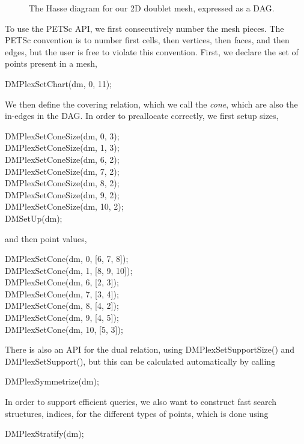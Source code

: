 {{\begin{figure}
\caption{The Hasse diagram for our 2D doublet mesh, expressed as a DAG.}
\label{fig:doubletSieve}
\end{figure}
To use the PETSc API, we first consecutively number the mesh pieces. The PETSc convention is to number first cells,
then vertices, then faces, and then edges, but the user is free to violate this convention. First, we declare the set of
points present in a mesh,
\begin{tabbing}
  DMPlexSetChart(dm, 0, 11);
\end{tabbing}
We then define the covering relation, which we call the \textit{cone}, which are also the in-edges in the DAG. In order
to preallocate correctly, we first setup sizes,
\begin{tabbing}
  DMPlexSetConeSize(dm, 0, 3);\\
  DMPlexSetConeSize(dm, 1, 3);\\
  DMPlexSetConeSize(dm, 6, 2);\\
  DMPlexSetConeSize(dm, 7, 2);\\
  DMPlexSetConeSize(dm, 8, 2);\\
  DMPlexSetConeSize(dm, 9, 2);\\
  DMPlexSetConeSize(dm, 10, 2);\\
  DMSetUp(dm);
\end{tabbing}
and then point values,
\begin{tabbing}
  DMPlexSetCone(dm, 0, [6, 7, 8]);\\
  DMPlexSetCone(dm, 1, [8, 9, 10]);\\
  DMPlexSetCone(dm, 6, [2, 3]);\\
  DMPlexSetCone(dm, 7, [3, 4]);\\
  DMPlexSetCone(dm, 8, [4, 2]);\\
  DMPlexSetCone(dm, 9, [4, 5]);\\
  DMPlexSetCone(dm, 10, [5, 3]);
\end{tabbing}

There is also an API for the dual relation, using DMPlexSetSupportSize() and DMPlexSetSupport(), but this can be
calculated automatically by calling
\begin{tabbing}
  DMPlexSymmetrize(dm);
\end{tabbing}
In order to support efficient queries, we also want to construct fast search structures, indices, for the different
types of points, which is done using
\begin{tabbing}
  DMPlexStratify(dm);
\end{tabbing}

}}

